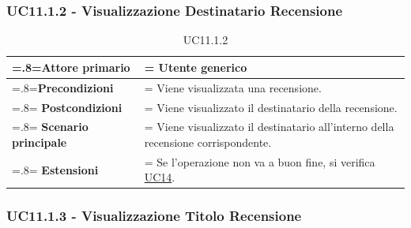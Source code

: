        \subsubsection{UC11.1.2 - Visualizzazione Destinatario Recensione}
        \label{UC11.1.2}

            \begin{table}[H]
                \centering
                \renewcommand{\arraystretch}{1.8}
                \renewcommand\tabularxcolumn[1]{m{#1}}
                \begin{tabularx}{0.9\textwidth} {
                    >{\hsize=.8\hsize\linewidth=\hsize}X
                    >{\hsize=1.2\hsize\linewidth=\hsize}X}
                    \hline
                    \textbf{Attore primario} & Utente generico \\
                    \hline
                    \textbf{Precondizioni} & Viene visualizzata una recensione. \\
                    \hline
                    \textbf{Postcondizioni} & Viene visualizzato il destinatario della recensione. \\
                    \hline
                    \textbf{Scenario principale} & Viene visualizzato il destinatario all'interno della recensione corrispondente. \\
                    \hline
                    \textbf{Estensioni} & Se l'operazione non va a buon fine, si verifica \hyperref[UC14]{UC14}. \\
                    \hline
                \end{tabularx}
                \caption{UC11.1.2}
            \end{table}

        \subsubsection{UC11.1.3 - Visualizzazione Titolo Recensione}
        \label{UC11.1.3}

